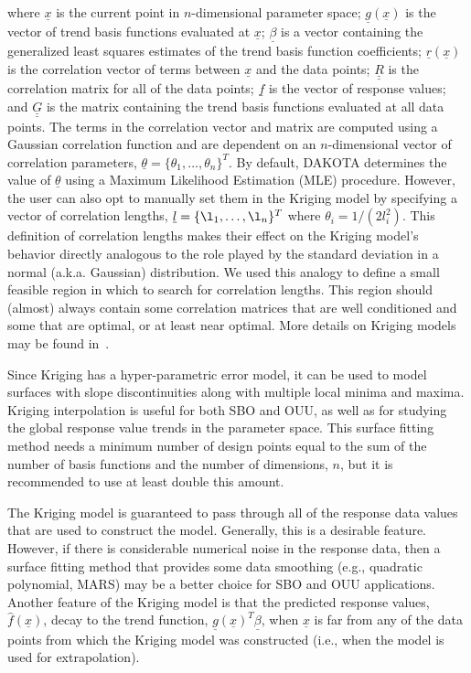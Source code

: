 where $\underline{x}$ is the current point in $n$-dimensional parameter
space; $\underline{g}(\underline{x})$ is the vector of trend basis 
functions evaluated at $\underline{x}$; $\underline{\beta}$ is a vector
containing the generalized least squares estimates of the trend basis 
function coefficients; $\underline{r}(\underline{x})$ is the correlation 
vector of terms between $\underline{x}$ and the data points;
$\underline{\underline{R}}$ is the correlation matrix for all of the 
data points; $\underline{f}$ is the vector of response values; and 
$\underline{\underline{G}}$ is the matrix containing the trend basis 
functions evaluated at all data points.  The terms in the correlation 
vector and matrix are computed using a Gaussian correlation function 
and are dependent on an $n$-dimensional vector of correlation parameters,
$\underline{\theta} = \{\theta_{1},\ldots,\theta_{n}\}^T$. By default, 
DAKOTA determines the value of $\underline{\theta}$ using a Maximum
Likelihood Estimation (MLE) procedure.  However, the user can also opt 
to manually set them in the Kriging model by specifying a vector of 
correlation lengths, $\underline{l}=\{\l_{1},\ldots,\l_{n}\}^T$ where 
$\theta_i=1/(2 l_i^2)$. This definition of correlation lengths makes 
their effect on the Kriging model's behavior directly analogous to the 
role played by the standard deviation in a normal (a.k.a. Gaussian) 
distribution.  We used this analogy to define a small feasible region
in which to search for correlation lengths.  This region should 
(almost) always contain some correlation matrices that are well 
conditioned and some that are optimal, or at least near optimal. 
More details on Kriging models may be found in~\cite{Giu98}.

Since Kriging has a hyper-parametric error model, it can be used 
to model surfaces with slope discontinuities along with multiple 
local minima and maxima. Kriging interpolation is useful for both 
SBO and OUU, as well as for studying the global response value trends 
in the parameter space. This surface fitting method needs a 
minimum number of design points equal to the sum of the number of 
basis functions and the number of dimensions, $n$, but it is 
recommended to use at least double this amount.

The Kriging model is guaranteed to pass through all of the response 
data values that are used to construct the model. Generally, this is a
desirable feature. However, if there is considerable numerical noise
in the response data, then a surface fitting method that provides some
data smoothing (e.g., quadratic polynomial, MARS) may be a better
choice for SBO and OUU applications. Another feature of the Kriging
model is that the predicted response values, $\hat{f}(\underline{x})$,
decay to the trend function, 
$\underline{g}(\underline{x})^T\underline{\beta}$, when $\underline{x}$ 
is far from any of the data points from which the Kriging model was 
constructed (i.e., when the model is used for extrapolation). 

